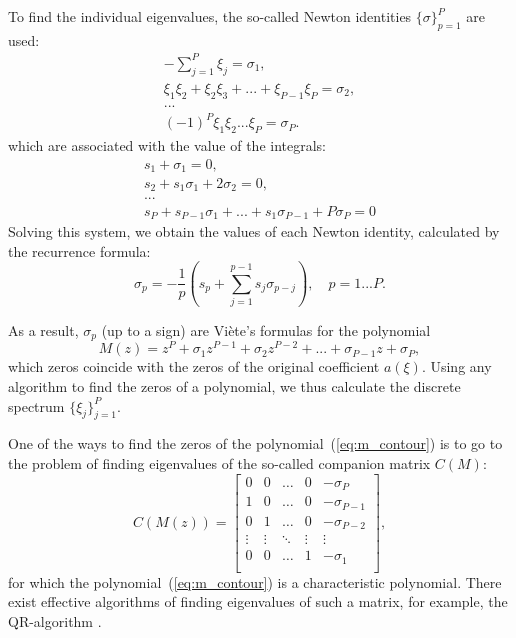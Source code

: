 To find the individual eigenvalues, the so-called Newton identities $ \{\sigma \}_{p = 1}^P $ are used:
\begin{eqnarray}
    - \sum_{j=1}^P \xi_j = \sigma_1 {,} \nonumber \\
    \xi_1 \xi_2 + \xi_2 \xi_3 + ... + \xi_{P-1} \xi_P = \sigma_2 {,} \nonumber \\
    ... \nonumber \\
    (-1)^P \xi_1 \xi_2 ... \xi_P = \sigma_P {.}
\end{eqnarray}
which are associated with the value of the integrals:
\begin{eqnarray}
    s_1 + \sigma_1 = 0 {,} \nonumber \\
    s_2 + s_1 \sigma_1 + 2 \sigma_2 = 0 {,} \nonumber \\
    ... \nonumber \\
    s_P + s_{P-1} \sigma_1 + ... + s_1 \sigma_{P-1} + P \sigma_P = 0 
\end{eqnarray}
Solving this system, we obtain the values of each Newton identity, calculated by the recurrence formula:
\begin{equation}
    \sigma_p = -\frac{1}{p} \left( s_p + \sum_{j = 1}^{p-1} s_j \sigma_{p-j} \right){,} \quad p = 1...P {.}
\end{equation}

As a result, $ \sigma_p $ (up to a sign) are Viète’s formulas for the polynomial
\begin{equation}
    M(z) = z^P + \sigma_1 z^{P-1} + \sigma_2 z^{P-2} + ... + \sigma_{P-1} z + \sigma_{P} {,}
    \label{eq:m_contour}
\end{equation}
which zeros coincide with the zeros of the original coefficient $ a (\xi) $. Using any algorithm to find the zeros of a polynomial, we thus calculate the discrete spectrum $ \{\xi_j \}_{j = 1}^{P} $.

One of the ways to find the zeros of the polynomial~(\ref{eq:m_contour}) is to go to the problem of finding eigenvalues of the so-called companion matrix $ C (M) $:
\begin{equation}
    C(M(z)) = 
    \begin{bmatrix}
        0 & 0 & \dots & 0 & -\sigma_{P} \\
        1 & 0 & \dots & 0 & -\sigma_{P-1} \\
        0 & 1 & \dots & 0 & -\sigma_{P-2} \\
        \vdots & \vdots & \ddots & \vdots & \vdots \\
        0 & 0 & \dots & 1 & -\sigma_{1} \\
    \end{bmatrix} {,}
\end{equation}
for which the polynomial~(\ref{eq:m_contour}) is a characteristic polynomial.
There exist effective algorithms of finding eigenvalues of such a matrix, for example, the QR-algorithm \cite{kublanovskaya1963, francis1961, francis1962}.

